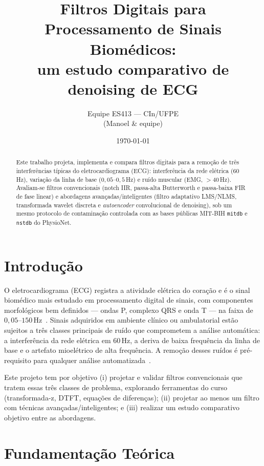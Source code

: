 \documentclass[11pt,a4paper]{article}
\title{Filtros Digitais para Processamento de Sinais Biom\'edicos:\\
um estudo comparativo de denoising de ECG}
\author{Equipe ES413 --- CIn/UFPE\\\small (Manoel \& equipe)}
\date{\today}
\begin{document}
\maketitle

\begin{abstract}
Este trabalho projeta, implementa e compara filtros digitais para a remo\c{c}\~ao de
tr\^es interfer\^encias t\'ipicas do eletrocardiograma (ECG): interfer\^encia da rede
el\'etrica ($60\,$Hz), varia\c{c}\~ao da linha de base ($0{,}05$--$0{,}5\,$Hz) e ru\'ido
muscular (EMG, $>40\,$Hz). Avaliam-se filtros convencionais (notch IIR, passa-alta
Butterworth e passa-baixa FIR de fase linear) e abordagens avan\c{c}adas/inteligentes
(filtro adaptativo LMS/NLMS, transformada wavelet discreta e \emph{autoencoder}
convolucional de denoising), sob um mesmo protocolo de contamina\c{c}\~ao controlada com as
bases p\'ublicas MIT-BIH \texttt{mitdb} e \texttt{nstdb} do PhysioNet.
\end{abstract}

\section{Introdu\c{c}\~ao}
O eletrocardiograma (ECG) registra a atividade el\'etrica do cora\c{c}\~ao e \'e o sinal
biom\'edico mais estudado em processamento digital de sinais, com componentes
morfol\'ogicos bem definidos --- ondas P, complexo QRS e onda T --- na faixa de
$0{,}05$--$150\,$Hz~\cite{rangayyan2024}. Sinais adquiridos em ambiente cl\'inico ou
ambulatorial est\~ao sujeitos a tr\^es classes principais de ru\'ido que comprometem a
an\'alise autom\'atica: a interfer\^encia da rede el\'etrica em $60\,$Hz, a deriva de baixa
frequ\^encia da linha de base e o artefato mioel\'etrico de alta frequ\^encia. A remo\c{c}\~ao
desses ru\'idos \'e pr\'e-requisito para qualquer an\'alise
automatizada~\cite{challis1982part1}.

Este projeto tem por objetivo (i) projetar e validar filtros convencionais que tratem
essas tr\^es classes de problema, explorando ferramentas do curso (transformada-z, DTFT,
equa\c{c}\~oes de diferen\c{c}as); (ii) projetar ao menos um filtro com t\'ecnicas
avan\c{c}adas/inteligentes; e (iii) realizar um estudo comparativo objetivo entre as
abordagens.

\section{Fundamenta\c{c}\~ao Te\'orica}
\end{document}
